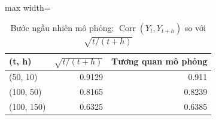 \begin{table}[H]
\centering\footnotesize
\caption{Bước ngẫu nhiên mô phỏng: $\operatorname{Corr}(Y_t,Y_{t+h})$ so với $\sqrt{t/(t+h)}$}\label{tab:tab_b12_02_rw_correlation}
\begin{adjustbox}{max width=\linewidth}
\begin{tabular}{|l|r|r|}
\toprule
(t, h) & $\sqrt{t/(t+h)}$ & Tương quan mô phỏng \\
\midrule
(50, 10) & 0.9129 & 0.911 \\
(100, 50) & 0.8165 & 0.8239 \\
(100, 150) & 0.6325 & 0.6385 \\
\bottomrule
\end{tabular}
\end{adjustbox}
\end{table}

